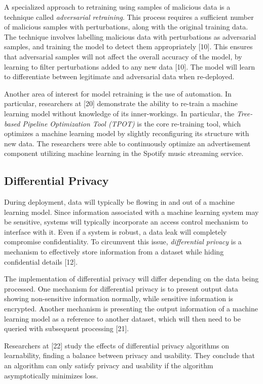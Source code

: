 \documentclass[11pt,conference]{IEEEtran}
\begin{document}
A specialized approach to retraining using samples of malicious data is a technique called
\emph{adversarial retraining}. This process requires  
a sufficient number of malicious samples with perturbations, along with the
original training data. The technique
involves labelling malicious data with perturbations as adversarial samples, and training
the model to detect them appropriately [10]. This ensures that adversarial samples will not affect
the overall accuracy of the model, by learning to filter perturbations added to
any new data [10]. The model will learn to differentiate between legitimate and
adversarial data when re-deployed.

Another area of interest for model retraining is the use of automation. In
particular, researchers at [20] demonstrate the ability to re-train a
machine learning model without knowledge of its inner-workings. In particular,
the \emph{Tree-based Pipeline Optimization Tool (TPOT)} is the core re-training
tool, which optimizes a machine learning model by slightly reconfiguring its
structure with new data. The researchers were able to continuously optimize an
advertisement component utilizing machine learning in the Spotify music
streaming service.

\subsection{Differential Privacy}
During deployment, data will typically be flowing in and out of a machine
learning model. Since information associated with a machine learning system may be
sensitive, systems will typically incorporate an access control mechanism to interface with it. Even if a system
is robust, a data leak will completely compromise confidentiality. To
circumvent this issue, \emph{differential privacy} is a mechanism to
effectively store
information from a dataset while hiding confidential details [12].

The implementation of differential privacy will differ depending on the data
being processed. One mechanism for differential privacy is to present
output data showing non-sensitive information normally, while sensitive
information is encrypted. Another mechanism is presenting the output
information of a machine learning model as a reference to another dataset, which
will then need to be queried with subsequent processing [21].

Researchers at [22] study the effects of differential privacy algorithms on
learnability, finding a balance between privacy and usability. They conclude
that an algorithm can only satisfy privacy and usability if the algorithm
asymptotically minimizes loss.
\end{document}
